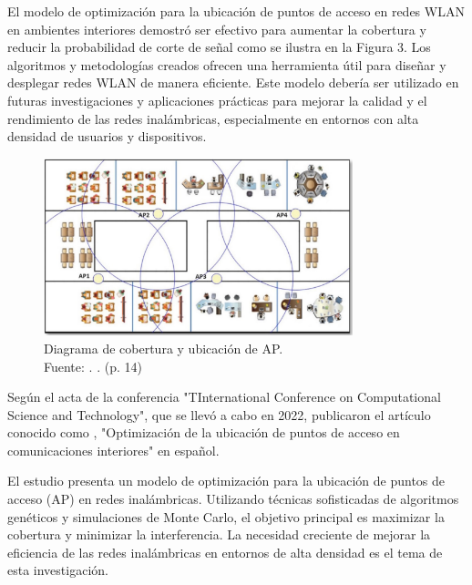 El modelo de optimización para la ubicación de puntos de acceso en redes WLAN en ambientes interiores demostró ser efectivo para aumentar la cobertura y reducir la probabilidad de corte de señal como se ilustra en la Figura 3. Los algoritmos y metodologías creados ofrecen una herramienta útil para diseñar y desplegar redes WLAN de manera eficiente. Este modelo debería ser utilizado en futuras investigaciones y aplicaciones prácticas para mejorar la calidad y el rendimiento de las redes inalámbricas, especialmente en entornos con alta densidad de usuarios y dispositivos.

\begin{figure}[!ht]
	\begin{center}
		\includegraphics[width=0.80\textwidth]{2/figures/contreras2021.png}
		\caption[Diagrama de cobertura y ubicación de AP]{Diagrama de cobertura y ubicación de AP.\\
			Fuente: \cite{pr_contreras2021modelwlan}. . (p. 14)}
		\label{2:fig111}
	\end{center}
\end{figure}

Según el acta de la conferencia "TInternational Conference on Computational Science and Technology", que se llevó a cabo en 2022, \cite{pr_alathari2023optaps} publicaron el artículo conocido como , "Optimización de la ubicación de puntos de acceso en comunicaciones interiores" en español.

El estudio presenta un modelo de optimización para la ubicación de puntos de acceso (AP) en redes inalámbricas. Utilizando técnicas sofisticadas de algoritmos genéticos y simulaciones de Monte Carlo, el objetivo principal es maximizar la cobertura y minimizar la interferencia. La necesidad creciente de mejorar la eficiencia de las redes inalámbricas en entornos de alta densidad es el tema de esta investigación.

